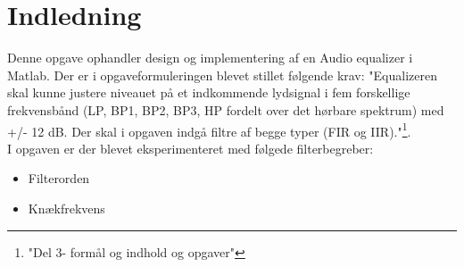 \chapter{Indledning}\label{ch:introduction}
Denne opgave ophandler design og implementering af en Audio equalizer i Matlab. Der er i opgaveformuleringen blevet stillet følgende krav: "Equalizeren skal kunne justere niveauet på et indkommende lydsignal i fem forskellige frekvensbånd (LP, BP1, BP2, BP3, HP fordelt over det hørbare spektrum) med +/- 12 dB. Der skal i opgaven indgå filtre af begge typer (FIR og IIR)."\footnote{"Del 3- formål og indhold og opgaver"}. \\I opgaven er der blevet eksperimenteret med følgede filterbegreber:

\begin{itemize}
	\item Filterorden
	\item Knækfrekvens
\end{itemize}

